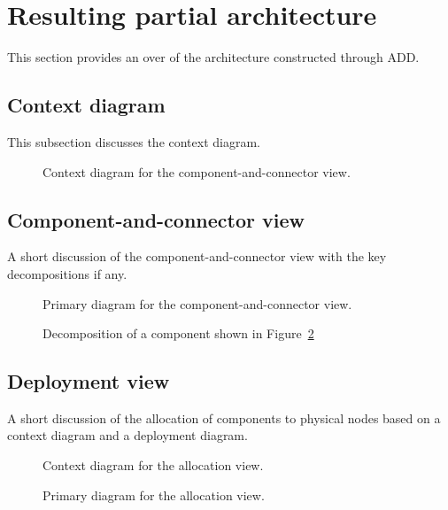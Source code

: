 \documentclass[a4paper,10pt]{article}
\begin{document}
\section{Resulting partial architecture}\label{sec:architecture}
This section provides an over of the architecture constructed through ADD\@.

\subsection{Context diagram}
This subsection discusses the context diagram.

\begin{figure}[!htp]
    \centering
    \caption{Context diagram for the component-and-connector view.
        }\label{fig:cc_context}
\end{figure}

\subsection{Component-and-connector view}
A short discussion of the component-and-connector view with the key
decompositions if any.

\begin{figure}[!htp]
    \centering
    \caption{Primary diagram for the component-and-connector view.
        }\label{fig:cc_main}
\end{figure}

\begin{figure}[!htp]
    \centering
    \caption{Decomposition of a component shown in Figure~\ref{fig:cc_main}
        }\label{fig:decomp_decomp1}
\end{figure}

\subsection{Deployment view}
A short discussion of the allocation of components to physical nodes based on a
context diagram and a deployment diagram.

\begin{figure}[!htp]
    \centering
    \caption{Context diagram for the allocation view.}\label{fig:depl_context}
\end{figure}

\begin{figure}[!htp]
    \centering
    \caption{Primary diagram for the allocation view.}\label{fig:depl_main}
\end{figure}
\end{document}
